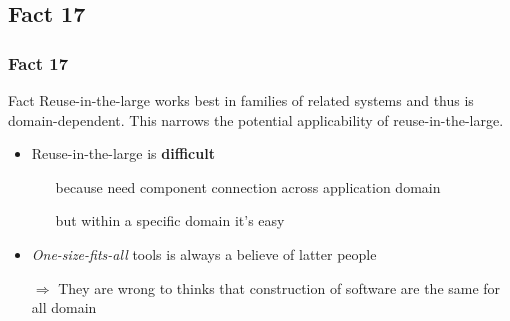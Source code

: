 \documentclass{beamer}
\begin{document}
\subsection{Fact 17}
\begin{frame}
    \frametitle{Fact 17}
    \begin{block}{Fact}
    Reuse-in-the-large works best in families of related systems and thus is
    domain-dependent. This narrows the potential applicability of
    reuse-in-the-large.
    \end{block}
    
    \begin{itemize}

    \item Reuse-in-the-large is \textbf{difficult} 
    \begin{itemize}
        \item[\alert{because}] need component connection across
            application domain
        \item[\alert{but}] within a specific domain it's easy
    \end{itemize}

    \item \textit{One-size-fits-all} tools is always a believe of latter
    people  

        $\Rightarrow$ They are wrong to thinks that construction of
        software are the same for all domain

        \end{itemize}

\end{frame}
\end{document}
